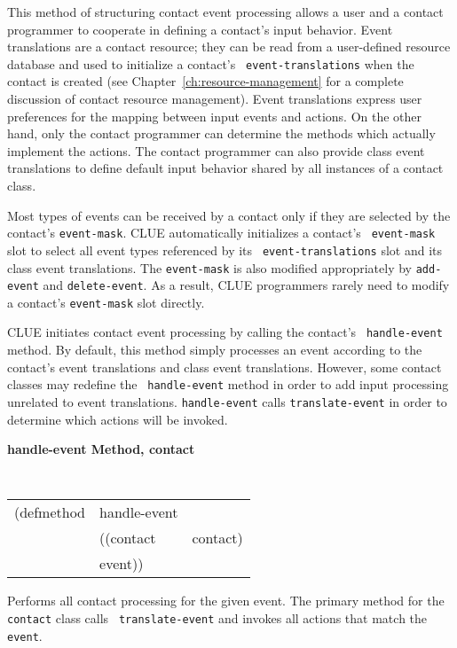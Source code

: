 This method of structuring contact event processing allows a user and a contact
programmer to cooperate in defining a contact's input behavior.
Event translations are a contact resource; they can be read from a
user-defined resource
database and used to initialize a contact's {\tt
event-translations} when
the contact is created (see Chapter~\ref{ch:resource-management}
for a complete discussion of contact resource management). Event translations
express user preferences for the mapping between input events and 
actions. On the other hand, only the contact programmer can determine the
methods which actually implement the actions.
The contact programmer can also provide class event translations to define default
input behavior shared by all instances of a contact class.

Most types of events can be received by a contact only if they are selected by
the contact's {\tt event-mask}.  CLUE automatically initializes a contact's {\tt
event-mask} slot to select all event types referenced by its {\tt
event-translations} slot and its class event translations.  The {\tt event-mask}
is also modified appropriately by {\tt add-event} and {\tt delete-event}.
As a result, CLUE programmers rarely need to modify a contact's {\tt event-mask}
slot directly.

CLUE initiates contact event processing by calling the contact's {\tt
handle-event} method.  By default, this method simply processes an event
according to the contact's event translations and class event
translations. 
However, some
contact classes may redefine the {\tt
handle-event} method in order to add input processing unrelated to event
translations.
{\tt handle-event} calls {\tt translate-event} in order to determine
which actions will be invoked.


{\samepage
{\large {\bf handle-event \hfill Method, contact}}
\begin{flushright} \parbox[t]{6.125in}{
\tt
\begin{tabular}{lll}
\raggedright
(defmethod & handle-event & \\
& ((contact  &contact)\\ 
& event))
\end{tabular}
\rm

}\end{flushright}}

\begin{flushright} \parbox[t]{6.125in}{
Performs all contact processing for the given event. 
The primary method for the {\tt contact} class calls {\tt
translate-event} and invokes all actions that match the {\tt event}.

}\end{flushright}

